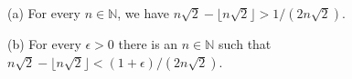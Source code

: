 (a) For every $n \in \mathbb{N}$, we have $n\sqrt{2} - \lfloor n\sqrt{2} \rfloor > 1/(2n\sqrt{2})$.

(b) For every $\epsilon > 0$ there is an $n \in \mathbb{N}$ such that $n\sqrt{2} - \lfloor n\sqrt{2} \rfloor < (1 + \epsilon)/(2n\sqrt{2})$.
